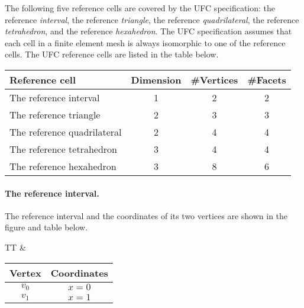 
The following five reference cells are covered by the UFC
specification: the reference \emph{interval}, the reference
\emph{triangle}, the reference \emph{quadrilateral}, the reference
\emph{tetrahedron}, and the reference \emph{hexahedron}.  The UFC
specification assumes that each cell in a finite element mesh is
always isomorphic to one of the reference cells. The UFC reference
cells are listed in the table below.

\vspace{0.5cm}
\begin{center}
  \begin{tabular}{lccc}
    \toprule
    Reference cell & Dimension & \#Vertices & \#Facets \\
    \hline
    The reference interval      & 1 & 2 & 2 \\
    The reference triangle      & 2 & 3 & 3 \\
    The reference quadrilateral & 2 & 4 & 4 \\
    The reference tetrahedron   & 3 & 4 & 4 \\
    The reference hexahedron    & 3 & 8 & 6 \\
    \bottomrule
  \end{tabular}
\end{center}

\paragraph{The reference interval.}

The reference interval and the coordinates of its two vertices are
shown in the figure and table below.


\begin{center}
  \begin{tabular}{TT}
    &
    \begin{tabular}{cc}
      \toprule
      Vertex & Coordinates \\
      \hline
      $v_0$ & $x = 0$ \\
      $v_1$ & $x = 1$ \\
      \bottomrule
    \end{tabular}
  \end{tabular}
\end{center}

